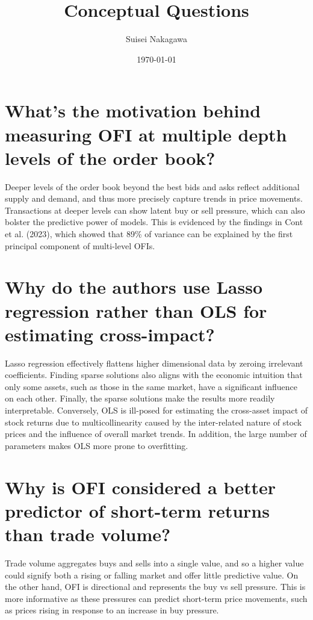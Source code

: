 \documentclass{article}
\begin{document}
\title{Conceptual Questions}
\author{Suisei Nakagawa}
\date{\today}
\maketitle

\section{What’s the motivation behind measuring OFI at multiple depth levels of the order book?}

Deeper levels of the order book beyond the best bids and asks reflect additional supply and demand, and thus more precisely capture trends in price movements. Transactions at deeper levels can show latent buy or sell pressure, which can also bolster the predictive power of models. This is evidenced by the findings in Cont et al. (2023), which showed that 89\% of variance can be explained by the first principal component of multi-level OFIs. 


\section{Why do the authors use Lasso regression rather than OLS for estimating cross-impact?}

Lasso regression effectively flattens higher dimensional data by zeroing irrelevant coefficients.  Finding sparse solutions also aligns with the economic intuition that only some assets, such as those in the same market, have a significant influence on each other. Finally, the sparse solutions make the results more readily interpretable. 
Conversely, OLS is ill-posed for estimating the cross-asset impact of stock returns due to multicollinearity caused by the inter-related nature of stock prices and the influence of overall market trends. In addition, the large number of parameters makes OLS more prone to overfitting. 


\section{Why is OFI considered a better predictor of short-term returns than trade volume?}

Trade volume aggregates buys and sells into a single value, and so a higher value could signify both a rising or falling market and offer little predictive value. On the other hand, OFI is directional and represents the buy vs sell pressure. This is more informative as these pressures can predict short-term price movements, such as prices rising in response to an increase in buy pressure. 
\end{document}
